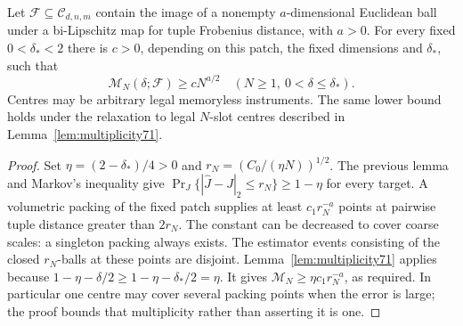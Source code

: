 \begin{theorem}\label{thm:fullpacking71}
Let $\mathcal F\subseteq\mathcal C_{d,n,m}$ contain the image of a
nonempty $a$-dimensional Euclidean ball under a bi-Lipschitz map for
tuple Frobenius distance, with $a>0$. For every fixed $0<\delta_*<2$
there is $c>0$, depending on this patch, the fixed dimensions and
$\delta_*$, such that
\begin{equation}\label{eq:fullpacking71}
       \mathcal M_N(\delta;\mathcal F)\ge cN^{a/2}
             \quad(N\ge1,\ 0<\delta\le\delta_*).
\end{equation}
Centres may be arbitrary legal memoryless instruments. The same lower
bound holds under the relaxation to legal $N$-slot centres described
in Lemma~\ref{lem:multiplicity71}.
\end{theorem}
\begin{proof}
Set $\eta=(2-\delta_*)/4>0$ and
$r_N=(C_0/(\eta N))^{1/2}$. The previous lemma and Markov's inequality
give
$\Pr_J\{|\widehat J-J|_2\le r_N\}\ge1-\eta$ for every target.
A volumetric packing of the fixed patch supplies at least
$c_1r_N^{-a}$ points at pairwise tuple distance greater than $2r_N$.
The constant can be decreased to cover coarse scales: a singleton
packing always exists. The estimator events consisting of the closed
$r_N$-balls at these points are disjoint. Lemma~\ref{lem:multiplicity71}
applies because
$1-\eta-\delta/2\ge1-\eta-\delta_*/2=\eta$.
It gives $\mathcal M_N\ge\eta c_1r_N^{-a}$, as required. In
particular one centre may cover several packing points when the error
is large; the proof bounds that multiplicity rather than asserting it
is one.
\end{proof}

